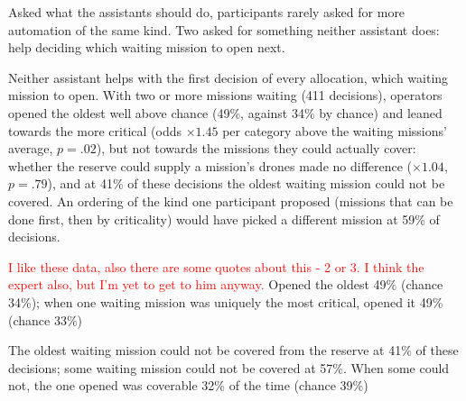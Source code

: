 Asked what the assistants should do, participants rarely asked for more automation of the same kind. Two asked for something neither assistant does: help deciding which waiting mission to open next.


\label{sec:qual:new-jobs:queue-order}
Neither assistant helps with the first decision of every allocation, which waiting mission to open. With two or more missions waiting (411 decisions), operators opened the oldest well above chance (49\%, against 34\% by chance) and leaned towards the more critical (odds $\times 1.45$ per category above the waiting missions' average, $p = .02$), but not towards the missions they could actually cover: whether the reserve could supply a mission's drones made no difference ($\times 1.04$, $p = .79$), and at 41\% of these decisions the oldest waiting mission could not be covered. An ordering of the kind one participant proposed (missions that can be done first, then by criticality) would have picked a different mission at 59\% of decisions.

\textcolor{red}{I like these data, also there are some quotes about this - 2 or 3. I think the expert also, but I'm yet to get to him anyway.}
Opened the oldest 49\% (chance 34\%); when one waiting mission was uniquely the most critical, opened it 49\% (chance 33\%)

The oldest waiting mission could not be covered from the reserve at 41\% of these decisions; some waiting mission could not be covered at 57\%. When some could not, the one opened was coverable 32\% of the time (chance 39\%)


\clearpage
